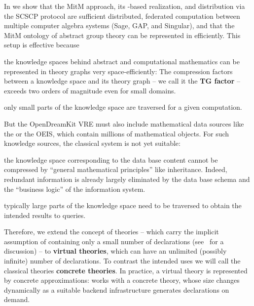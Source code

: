 In \cite{KohMuePfe:kbimss17} we show that the MitM approach, its \ommt-based realization,
and distribution via the SCSCP protocol are sufficient distributed, federated computation
between multiple computer algebra systems (Sage, GAP, and Singular), and that the MitM
ontology of abstract group theory can be represented in \ommt efficiently. This setup is
effective because
\begin{compactenum}[\bf C1]
\item the knowledge spaces behind abstract and computational mathematics can be
  represented in theory graphs very space-efficiently: The compression factors between a
  knowledge space and its theory graph -- we call it the \textbf{TG factor} --
  exceeds two orders of magnitude even for small domains.
\item only small parts of the knowledge space are traversed for a given computation. 
\end{compactenum}

But the \textsf{OpenDreamKit} VRE must also include mathematical data sources like the \lmfdb or
the OEIS, which contain millions of mathematical objects. For such knowledge sources, the
classical \mmt system is not yet suitable: 
\begin{compactenum}[\bf V1]
\item the knowledge space corresponding to the data base content cannot be compressed by
  ``general mathematical principles'' like inheritance. Indeed, redundant information is
  already largely eliminated by the data base schema and the ``business logic'' of the
  information system.
\item typically large parts of the knowledge space need to be traversed to obtain the
  intended results to queries.
\end{compactenum}
Therefore, we extend the concept of \ommt theories -- which carry the implicit
assumption of containing only a small number of declarations (see~\cite{FaGu:lt92} for a
discussion) -- to \textbf{virtual theories}, which can have an unlimited (possibly infinite) number of
declarations.
To contrast the intended
uses we will call the classical \ommt theories \textbf{concrete theories}. 
In practice, a virtual theory is represented by concrete approximations: \ommt works with a concrete theory, whose size changes dynamically as a suitable backend infrastructure generates declarations on demand.


